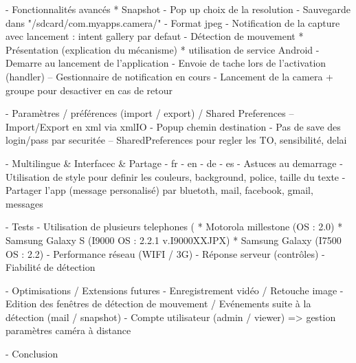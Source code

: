   - Fonctionnalités avancés
    * Snapshot
      - Pop up choix de la resolution
      - Sauvegarde dans "/sdcard/com.myapps.camera/"
      - Format jpeg
      - Notification de la capture avec lancement : intent gallery par defaut
  - Détection de mouvement
    * Présentation (explication du mécanisme) 
    * utilisation de service Android
      - Demarre au lancement de l'application
      - Envoie de tache lors de l'activation (handler)
      -- Gestionnaire de notification en cours
       - Lancement de la camera + groupe pour desactiver en cas de retour
       
  - Paramètres / préférences (import / export) / Shared Preferences
    -- Import/Export en xml via xmlIO
     - Popup chemin destination
     - Pas de save des login/pass par securitée
    -- SharedPreferences pour regler les TO, sensibilité, delai

  - Multilingue & Interfacec & Partage
    - fr - en - de - es
    - Astuces au demarrage
    - Utilisation de style pour definir les couleurs, background, police, taille
      du texte
    - Partager l'app (message personalisé) par bluetoth, mail, facebook, gmail,
      messages
      

- Tests
  - Utilisation de plusieurs telephones (
    * Motorola millestone (OS : 2.0)
    * Samsung Galaxy S (I9000 OS : 2.2.1 v.I9000XXJPX) 
    * Samsung Galaxy (I7500 OS : 2.2)
  - Performance  réseau (WIFI / 3G) - Réponse serveur (contrôles)
  - Fiabilité de détection

- Optimisations / Extensions futures
  - Enregistrement vidéo / Retouche image
  - Edition des fenêtres de détection  de mouvement / Evénements suite à
    la détection (mail / snapshot)
  - Compte utilisateur (admin / viewer) => gestion paramètres caméra à distance

- Conclusion